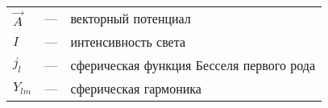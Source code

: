 
\begin{longtable}{lp{}p{}}
$\vec A$ & --- & векторный потенциал\\
$I$ & --- & интенсивность света\\
$j_l$ & --- & сферическая функция Бесселя первого рода\\
$Y_{lm}$ & --- & сферическая гармоника\\
\end{longtable}
